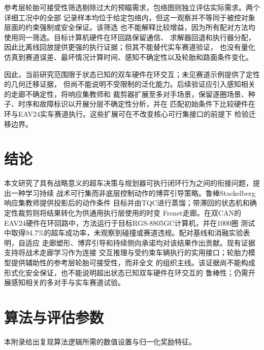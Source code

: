 \documentclass[final,5p,twocolumn]{elsarticle}
\begin{document}
参考层轮胎可接受性筛选剔除过大的预瞄需求，包络图则独立评估实际需求。两个详细工况中的全部
记录样本均位于给定包络内，但这一观察并不等同于被控对象层面的约束强制或安全保证。该筛选
也不能解释比较增益，因为所有配对方法均使用同一筛选。目标计算机硬件在环回路保留通信、
求解器回退和执行器分配，因此比离线回放提供更强的执行证据；但其不能替代实车赛道验证，
也没有量化仿真到赛道误差、最坏情况计算时间、感知不确定性以及轮胎和路面条件变化。

因此，当前研究范围限于状态已知的双车硬件在环交互；未见赛道示例提供了定性的几何迁移证据，
但尚不能说明不受限制的泛化能力。后续验证应引入感知相关的走廊不确定性，将响应集教师和
裁剪器扩展至多对手场景，保留逐圈场景、种子、时序和故障标识以开展分层不确定性分析，并在
匹配初始条件下比较硬件在环与EAV24实车赛道执行。这些扩展可在不改变核心可行集接口的前提下
检验迁移边界。

\section{结论}\label{sec:conclusion}
本文研究了具有战略意义的超车决策与规划器可执行闭环行为之间的衔接问题，提出一种学习持续
战术可行集而非底层控制动作的博弈引导策略。鲁棒Stackelberg响应集教师提供投影后的动作条件
目标并由TQC进行蒸馏；带滞回的状态机和确定性裁剪则将结果转化为供通用执行层使用的时变
Frenet走廊。在双CAN的EAV24硬件在环回路中，方法运行于目标RGS-8805GC计算机，并在1000圈
测试中取得94.7\%的超车成功率，未观察到碰撞或赛道违规。配对基线和消融实验表明，自适应
走廊塑形、博弈引导和持续侧向承诺均对该结果作出贡献。现有证据支持将战术走廊学习作为连接
交互推理与受约束车辆执行的实用接口；轮胎力模型提供辅助性的参考层轮胎可接受性，而非全文
的组织主线。该证据尚不能构成形式化安全保证，也不能说明超出状态已知双车硬件在环交互的
鲁棒性；仍需开展感知相关的多对手与实车赛道试验。

\appendix
\section{算法与评估参数}
\label{app:parameters}
\setcounter{table}{0}

本附录给出复现算法逻辑所需的数值设置与归一化奖励特征。
\end{document}
